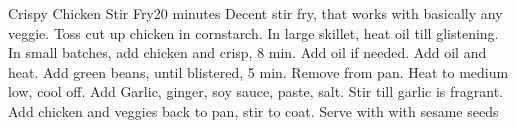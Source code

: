 \documentclass[a6paper,landscape]{article}
\begin{document}
\begin{recipe}{Crispy Chicken Stir Fry}{20 minutes}{}
  \freeform Decent stir fry, that works with basically any veggie. 
  Toss cut up chicken in cornstarch.
  In large skillet, heat oil till glistening. In small batches, add chicken and crisp, 8 min. Add oil if needed.
  Add oil and heat. Add green beans, until blistered, 5 min. Remove from pan.
  Heat to medium low, cool off. Add Garlic, ginger, soy sauce, paste, salt. Stir till garlic is fragrant. 
  \newstep Add chicken and veggies back to pan, stir to coat.
  Serve with with sesame seeds

  \end{recipe}
\end{document}
